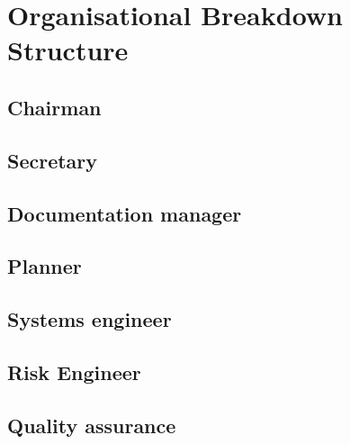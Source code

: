 \section{Organisational Breakdown Structure}\label{cha:OBS}

\subsection{Chairman}\label{par:Chairman}


\subsection{Secretary}\label{par:Secretary}


\subsection{Documentation manager}\label{par:D_and_A}


\subsection{Planner}\label{par:Planner}


\subsection{Systems engineer}\label{par:SE}


\subsection{Risk Engineer}\label{par:RiskEng}


\subsection{Quality assurance}\label{par:QA}

